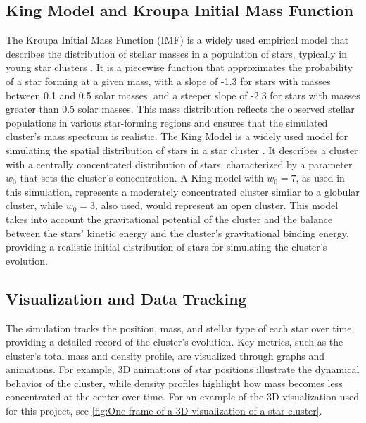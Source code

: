 \documentclass[10pt,twocolumn]{article}
\begin{document}
\subsection{King Model and Kroupa Initial Mass Function}
The Kroupa Initial Mass Function (IMF) is a widely used empirical model that describes the distribution of stellar masses in a population of stars, typically in young star clusters \cite{Kroupa2001}. It is a piecewise function that approximates the probability of a star forming at a given mass, with a slope of -1.3 for stars with masses between 0.1 and 0.5 solar masses, and a steeper slope of -2.3 for stars with masses greater than 0.5 solar masses. This mass distribution reflects the observed stellar populations in various star-forming regions and ensures that the simulated cluster's mass spectrum is realistic. The King Model is a widely used model for simulating the spatial distribution of stars in a star cluster \cite{king1966}. It describes a cluster with a centrally concentrated distribution of stars, characterized by a parameter $w_0$ that sets the cluster's concentration. A King model with $w_0=7$, as used in this simulation, represents a moderately concentrated cluster similar to a globular cluster, while $w_0=3$, also used, would represent an open cluster. This model takes into account the gravitational potential of the cluster and the balance between the stars' kinetic energy and the cluster's gravitational binding energy, providing a realistic initial distribution of stars for simulating the cluster's evolution.

\subsection{Visualization and Data Tracking}
The simulation tracks the position, mass, and stellar type of each star over time, providing a detailed record of the cluster’s evolution. Key metrics, such as the cluster’s total mass and density profile, are visualized through graphs and animations. For example, 3D animations of star positions illustrate the dynamical behavior of the cluster, while density profiles highlight how mass becomes less concentrated at the center over time. For an example of the 3D visualization used for this project, see \ref{fig:One frame of a 3D visualization of a star cluster}.
\end{document}
